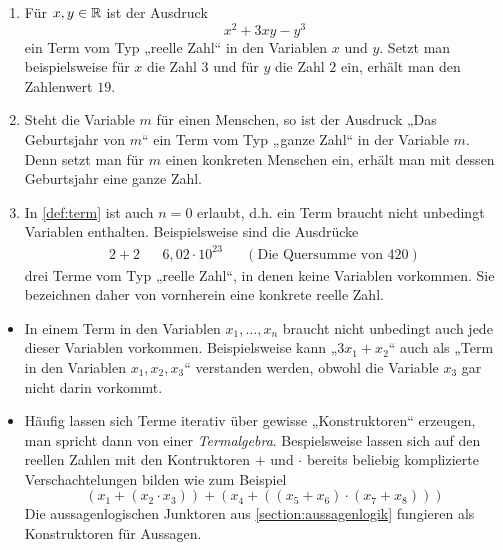 \begin{bsp} \quad
    \begin{enumerate}
        \item Für $x,y\in \mathbb R$ ist der Ausdruck
            \[ x^2+3xy-y^3 \]
        ein Term vom Typ „reelle Zahl“ in den Variablen $x$ und $y$. Setzt man beispielsweise für $x$ die Zahl $3$ und für $y$ die Zahl $2$ ein, erhält man den Zahlenwert $19$.
        \item Steht die Variable $m$ für einen Menschen, so ist der Ausdruck „Das Geburtsjahr von $m$“ ein Term vom Typ „ganze Zahl“ in der Variable $m$. Denn setzt man für $m$ einen konkreten Menschen ein, erhält man mit dessen Geburtsjahr eine ganze Zahl.
        \item In \cref{def:term} ist auch $n=0$ erlaubt, d.h. ein Term braucht nicht unbedingt Variablen enthalten. Beispielsweise sind die Ausdrücke
        \begin{align*}
             2+2 && 6{,}02\cdot 10^{23} && (\text{Die Quersumme von $420$})
        \end{align*}
        drei Terme vom Typ „reelle Zahl“, in denen keine Variablen vorkommen. Sie bezeichnen daher von vornherein eine konkrete reelle Zahl.
    \end{enumerate}
\end{bsp}


\begin{bem}[*] \label{konstruktoren} \quad
    \begin{itemize}
        \item In einem Term in den Variablen $x_1,\dots , x_n$ braucht nicht unbedingt auch jede dieser Variablen vorkommen. Beispielsweise kann „$3x_1+x_2$“ auch als „Term in den Variablen $x_1,x_2,x_3$“ verstanden werden, obwohl die Variable $x_3$ gar nicht darin vorkommt.
        \item Häufig lassen sich Terme iterativ über gewisse „Konstruktoren“ erzeugen, man spricht dann von einer \emph{Termalgebra}. Bespielsweise lassen sich auf den reellen Zahlen mit den Kontruktoren $+$ und $\cdot$ bereits beliebig komplizierte Verschachtelungen bilden wie zum Beispiel
            \[ (x_1 +(x_2\cdot x_3))+(x_4+((x_5+x_6)\cdot (x_7+x_8)))\]
        Die aussagenlogischen Junktoren aus \cref{section:aussagenlogik} fungieren als Konstruktoren für Aussagen.
    \end{itemize}
\end{bem}


